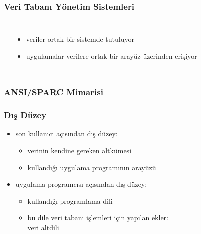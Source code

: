\documentclass[dvipsnames]{beamer}
\theoremstyle{definition}
\theoremstyle{example}
\theoremstyle{plain}
\begin{document}
\begin{frame}
  \frametitle{Veri Tabanı Yönetim Sistemleri}

  \begin{columns}[b]
    \begin{center}
    \end{center}

    \begin{itemize}
      \item veriler ortak bir sistemde tutuluyor
      \item uygulamalar verilere ortak bir arayüz üzerinden erişiyor
    \end{itemize}
  \end{columns}
\end{frame}

\begin{frame}
  \frametitle{ANSI/SPARC Mimarisi}

  \begin{center}
  \end{center}
\end{frame}

\begin{frame}
  \frametitle{Dış Düzey}

  \begin{itemize}
    \item son kullanıcı açısından dış düzey:
    \begin{itemize}
      \item verinin kendine gereken altkümesi
      \item kullandığı uygulama programının arayüzü
    \end{itemize}

    \pause
    \bigskip
    \item uygulama programcısı açısından dış düzey:
    \begin{itemize}
      \item kullandığı programlama dili
      \item bu dile veri tabanı işlemleri için yapılan ekler:\\
        \alert{veri altdili}
    \end{itemize}
  \end{itemize}
\end{frame}
\end{document}
